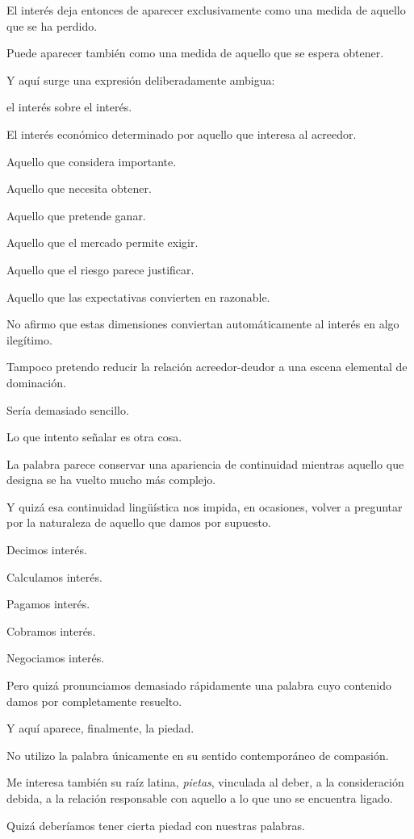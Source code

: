 \documentclass[12pt,a4paper]{article}
\begin{document}
El interés deja entonces de aparecer exclusivamente como una medida de aquello que se ha perdido.

Puede aparecer también como una medida de aquello que se espera obtener.

Y aquí surge una expresión deliberadamente ambigua:

el interés sobre el interés.

El interés económico determinado por aquello que interesa al acreedor.

Aquello que considera importante.

Aquello que necesita obtener.

Aquello que pretende ganar.

Aquello que el mercado permite exigir.

Aquello que el riesgo parece justificar.

Aquello que las expectativas convierten en razonable.

No afirmo que estas dimensiones conviertan automáticamente al interés en algo ilegítimo.

Tampoco pretendo reducir la relación acreedor-deudor a una escena elemental de dominación.

Sería demasiado sencillo.

Lo que intento señalar es otra cosa.

La palabra parece conservar una apariencia de continuidad mientras aquello que designa se ha vuelto mucho más complejo.

Y quizá esa continuidad lingüística nos impida, en ocasiones, volver a preguntar por la naturaleza de aquello que damos por supuesto.

Decimos interés.

Calculamos interés.

Pagamos interés.

Cobramos interés.

Negociamos interés.

Pero quizá pronunciamos demasiado rápidamente una palabra cuyo contenido damos por completamente resuelto.

Y aquí aparece, finalmente, la piedad.

No utilizo la palabra únicamente en su sentido contemporáneo de compasión.

Me interesa también su raíz latina, \emph{pietas}, vinculada al deber, a la consideración debida, a la relación responsable con aquello a lo que uno se encuentra ligado.

Quizá deberíamos tener cierta piedad con nuestras palabras.
\end{document}
